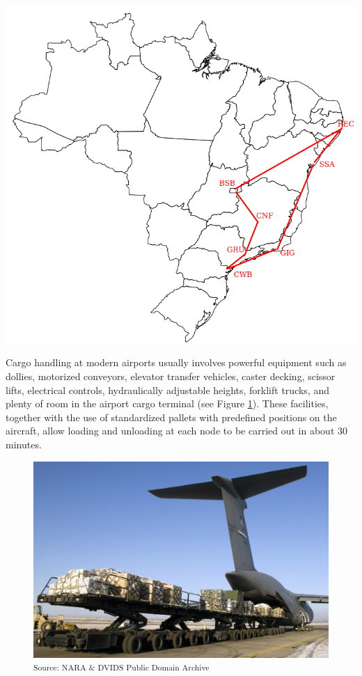 \documentclass[preprint]{elsarticle}
\begin{document}
\begin{table}[H]
\begin{minipage}{0.45\linewidth}
	\end{minipage}\hfill 
	\begin{minipage}{0.50\linewidth}
		\centering
		\includegraphics[scale=0.25]{Images/nodes.png}
		\label{fig:nodes}		
	\end{minipage}
\end{table}


Cargo handling at modern airports usually involves powerful equipment such as dollies, motorized conveyors, elevator transfer vehicles, caster decking, scissor lifts, electrical controls, hydraulically adjustable heights, forklift trucks, and plenty of room in the airport cargo terminal (see Figure \ref{fig:handling}). These facilities, together with the use of standardized pallets with predefined positions on the aircraft, allow loading and unloading at each node to be carried out in about 30 minutes.

\begin{figure}[H]
	\centering
	\includegraphics[scale=0.2]{Images/handling.png}
	\label{fig:handling}
	\small\textsuperscript{Source: NARA \& DVIDS Public Domain Archive}	
\end{figure}
\end{document}
